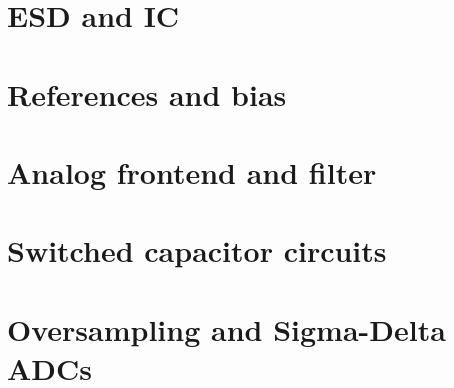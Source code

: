 \documentclass[11pt,twoside,openright]{book}
\begin{document}
\chapter{ESD and IC}


\chapter{References and bias}


\chapter{Analog frontend and filter}


\chapter{Switched capacitor circuits}


\chapter{Oversampling and Sigma-Delta ADCs}


%

%

%

%

%

%

%


%


\backmatter
\end{document}
